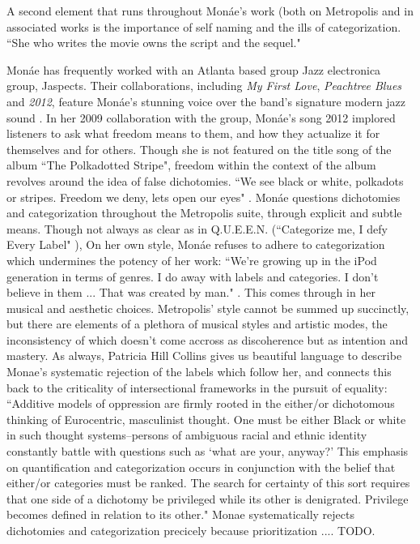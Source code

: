 \documentclass[a4paper, 11pt]{article} %
\begin{document}
A second element that runs throughout Mon\'ae's work (both on Metropolis and in associated works is the importance of self naming and the ills of categorization.
``She who writes the movie owns the script and the sequel." \cite{queen}


Mon\'ae has frequently worked with an Atlanta based group Jazz electronica group, Jaspects.
Their collaborations, including \emph{My First Love}, \emph{Peachtree Blues} and \emph{2012}, feature Mon\'ae's stunning voice over the band's signature modern jazz sound \cite{peachtreeblues} \cite{myfirstlove}.
In her 2009 collaboration with the group, Mon\'ae's song 2012 implored listeners to ask what freedom means to them, and how they actualize it for themselves and for others.
Though she is not featured on the title song of the album ``The Polkadotted Stripe", freedom within the context of the album revolves around the idea of false dichotomies.
``We see black or white, polkadots or stripes. Freedom we deny, lets open our eyes" \cite{polkadottedstripe}.
Mon\'ae questions dichotomies and categorization throughout the Metropolis suite, through explicit and subtle means.
Though not always as clear as in Q.U.E.E.N. (``Categorize me, I defy Every Label" \cite{queen}), 
On her own style, Mon\'ae refuses to adhere to categorization which undermines the potency of her work:
``We're growing up in the iPod generation in terms of genres. I do away with labels and categories. I don't believe in them ... That was created by man." \cite{joeyguerra2010}.
This comes through in her musical and aesthetic choices.
Metropolis' style cannot be summed up succinctly, but there are elements of a plethora of musical styles and artistic modes, the inconsistency of which doesn't come accross as discoherence but as intention and mastery.
As always, Patricia Hill Collins gives us beautiful language to describe Monae's systematic rejection of the labels which follow her, and connects this back to the criticality of intersectional frameworks in the pursuit of equality: ``Additive models of oppression are firmly rooted in the either/or dichotomous thinking of Eurocentric, masculinist thought. One must be either Black or white in such thought systems--persons of ambiguous racial and ethnic identity constantly battle with questions such as `what are your, anyway?' This emphasis on quantification and categorization occurs in conjunction with the belief that either/or categories must be ranked. The search for certainty of this sort requires that one side of a dichotomy be privileged while its other is denigrated. Privilege becomes defined in relation to its other." \cite{collins2009}
Monae systematically rejects dichotomies and categorization precicely because prioritization .... TODO.
\end{document}
